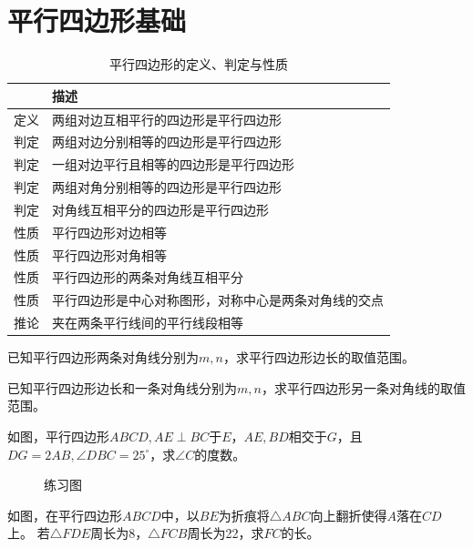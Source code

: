 \section{平行四边形基础}
\begin{table}[H]
    \centering
    \caption{平行四边形的定义、判定与性质}
    \begin{tabular}{|l|l|}
        \hline
           & 描述                         \\
        \hline
        定义 & 两组对边互相平行的四边形是平行四边形         \\
        \hline
        判定 & 两组对边分别相等的四边形是平行四边形         \\
        \hline
        判定 & 一组对边平行且相等的四边形是平行四边形        \\
        \hline
        判定 & 两组对角分别相等的四边形是平行四边形         \\
        \hline
        判定 & 对角线互相平分的四边形是平行四边形          \\
        \hline
        性质 & 平行四边形对边相等                  \\
        \hline
        性质 & 平行四边形对角相等                  \\
        \hline
        性质 & 平行四边形的两条对角线互相平分            \\
        \hline
        性质 & 平行四边形是中心对称图形，对称中心是两条对角线的交点 \\
        \hline
        推论 & 夹在两条平行线间的平行线段相等            \\
        \hline
    \end{tabular}
\end{table}
\begin{problem}
已知平行四边形两条对角线分别为$m,n$，求平行四边形边长的取值范围。
\end{problem}
\begin{problem}
已知平行四边形边长和一条对角线分别为$m,n$，求平行四边形另一条对角线的取值范围。
\end{problem}
\begin{problem}
如图，平行四边形$ABCD,AE\perp BC$于$E$，$AE,BD$相交于$G$，且$DG=2AB,\angle DBC=25^\circ$，求$\angle C$的度数。
\end{problem}
\begin{figure}[H]
    \centering
    \resizebox{4cm}{!}{}
    \caption{练习图}
\end{figure}
\begin{problem}
如图，在平行四边形$ABCD$中，以$BE$为折痕将$\triangle ABC$向上翻折使得$A$落在$CD$上。
若$\triangle FDE$周长为8，$\triangle FCB$周长为22，求$FC$的长。
\end{problem}
